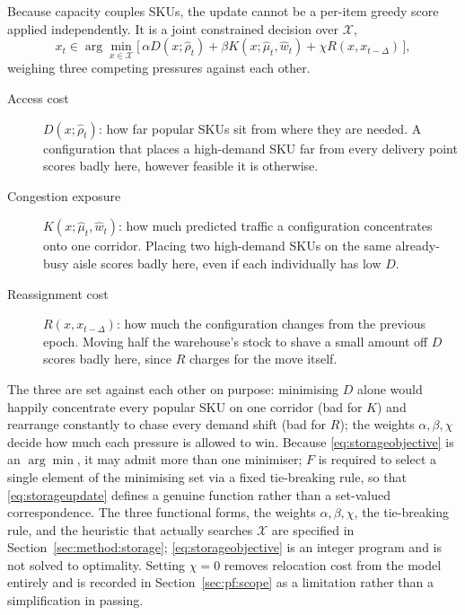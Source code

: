 \documentclass[../main.tex]{subfiles}
\begin{document}
Because capacity couples SKUs, the update cannot be a per-item greedy score
applied independently. It is a joint constrained decision over $\mathcal{X}$,
\begin{equation}
  x_t \in \arg\min_{x \in \mathcal{X}}
    \bigl[\, \alpha D(x; \hat{\rho}_t)
       + \beta K(x; \hat{\mu}_t, \hat{w}_t)
       + \chi R(x, x_{t-\Delta}) \,\bigr],
  \label{eq:storageobjective}
\end{equation}
weighing three competing pressures against each other.
\begin{description}
  \item[Access cost] $D(x;\hat\rho_t)$: how far popular SKUs sit from where
    they are needed. A configuration that places a high-demand SKU far from
    every delivery point scores badly here, however feasible it is
    otherwise.
  \item[Congestion exposure] $K(x;\hat\mu_t,\hat w_t)$: how much predicted
    traffic a configuration concentrates onto one corridor. Placing two
    high-demand SKUs on the same already-busy aisle scores badly here, even
    if each individually has low $D$.
  \item[Reassignment cost] $R(x,x_{t-\Delta})$: how much the configuration
    changes from the previous epoch. Moving half the warehouse's stock to
    shave a small amount off $D$ scores badly here, since $R$ charges for
    the move itself.
\end{description}
The three are set against each other on purpose: minimising $D$ alone would
happily concentrate every popular SKU on one corridor (bad for $K$) and
rearrange constantly to chase every demand shift (bad for $R$); the weights
$\alpha, \beta, \chi$ decide how much each pressure is allowed to win.
Because \eqref{eq:storageobjective} is an $\arg\min$, it may admit more than one %
minimiser; $F$ is required to select a single element of the minimising set via a
fixed tie-breaking rule, so that \eqref{eq:storageupdate} defines a genuine
function rather than a set-valued correspondence. The three functional forms, the
weights $\alpha, \beta, \chi$, the tie-breaking rule, and the heuristic that
actually searches $\mathcal{X}$ are specified in Section~\ref{sec:method:storage};
\eqref{eq:storageobjective} is an integer program and is not solved to
optimality. Setting $\chi = 0$ removes relocation cost from the model entirely
and is recorded in Section~\ref{sec:pf:scope} as a limitation rather than a
simplification in passing.

\end{document}
